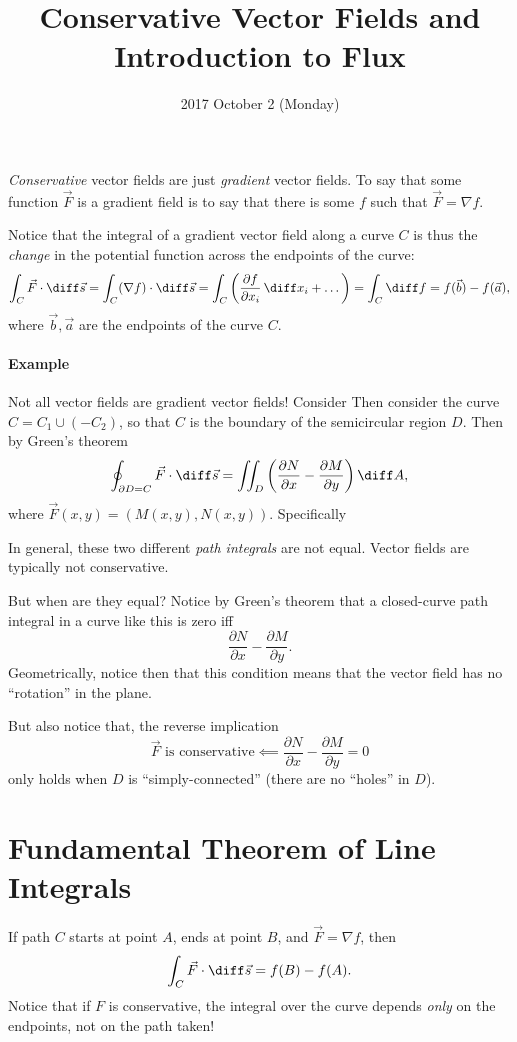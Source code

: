 \documentclass{multi}
\date{2017 October 2 (Monday)}
\title{Conservative Vector Fields and Introduction to Flux}
\begin{document}
\emph{Conservative} vector fields are just \emph{gradient} vector fields. To say that some function \(\vec F\) is a gradient field is to say that there is some \(f\) such that \(\vec F = \nabla f\).

Notice that the integral of a gradient vector field along a curve \(C\) is thus the \emph{change} in the potential function across the endpoints of the curve:
\[
    \int_C \vec F \cdot \diff \vec s = \int_C (\nabla f) \cdot \diff \vec s =
    \int_C \left(\frac{\partial f}{\partial x_i} \, \diff x_i + \dots\right) =
    \int_C \diff f = f(\vec b) - f(\vec a),
\]
where \(\vec b, \vec a\) are the endpoints of the curve \(C\).

\paragraph{Example}

Not all vector fields are gradient vector fields! Consider 
Then consider the curve \(C = C_1 \cup (-C_2)\), so that \(C\) is the boundary of the semicircular region \(D\). Then by Green's theorem
\[
    \oint_{\partial D = C} \vec F \cdot \diff \vec s = \iint_D \left(\frac{\partial N}{\partial x} - \frac{\partial M}{\partial y}\right) \diff A,
\]
where \(\vec F(x, y) = (M(x, y), N(x, y))\). Specifically

In general, these two different \emph{path integrals} are not equal. Vector fields are typically not conservative.

But when are they equal? Notice by Green's theorem that a closed-curve path integral in a curve like this is zero iff
\[
    \frac{\partial N}{\partial x} - \frac{\partial M}{\partial y}.
\]
Geometrically, notice then that this condition means that the vector field has no ``rotation'' in the plane.

But also notice that, the reverse implication
\[
    \text{\(\vec F\) is conservative} \impliedby 
    \frac{\partial N}{\partial x} - \frac{\partial M}{\partial y} = 0
\]
only holds when \(D\) is ``simply-connected'' (there are no ``holes'' in \(D\)).

\section*{Fundamental Theorem of Line Integrals}

If path \(C\) starts at point \(A\), ends at point \(B\), and \(\vec F = \nabla f\), then
\[
    \int_C \vec F \cdot \diff \vec s = f(B) - f(A).
\]
Notice that if \(F\) is conservative, the integral over the curve depends \emph{only} on the endpoints, not on the path taken!
\end{document}
